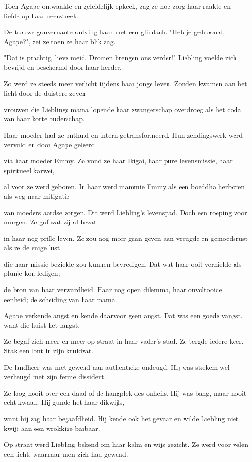 Toen Agape ontwaakte
en geleidelijk opkeek,
zag ze hoe zorg haar raakte
en liefde op haar neerstreek.

De trouwe gouvernante
ontving haar met een glimlach.
"Heb je gedroomd, Agape?",
zei ze toen ze haar blik zag.

"Dat is prachtig, lieve meid.
Dromen brengen ons verder!"
Liebling voelde zich bevrijd
en beschermd door haar herder.

Zo werd ze steeds meer verlicht
tijdens haar jonge leven.
Zonden kwamen aan het licht
door de duistere zeven

vrouwen die Lieblings mama
lopende haar zwangerschap
overdroeg als het coda
van haar korte ouderschap.

Haar moeder had ze onthuld
en intern getransformeerd.
Hun zendingswerk werd vervuld
en door Agape geleerd

via haar moeder Emmy.
Zo vond ze haar Ikigai,
haar pure levensmissie,
haar spiritueel karwei,

al voor ze werd geboren.
In haar werd mammie Emmy
als een boeddha herboren
als weg naar mitigatie

van moeders aardse zorgen.
Dit werd Liebling’s levenspad.
Doch een roeping voor morgen.
Ze gaf wat zij al bezat

in haar nog prille leven.
Ze zou nog meer gaan geven
aan vreugde en gemoedsrust als ze de enige lust

die haar missie bezielde
zou kunnen bevredigen.
Dat wat haar ooit vernielde
als plunje kon ledigen;

de bron van haar verwardheid.
Haar nog open dilemma,
haar onvoltooide eenheid;
de scheiding van haar mama.

Agape verkende angst
en kende daarvoor geen angst.
Dat was een goede vangst,
want die huist het langst.

Ze begaf zich meer en meer
op straat in haar vader’s stad.
Ze tergde iedere keer.
Stak een lont in zijn kruidvat.

De landheer was niet gewend
aan authentieke ondeugd.
Hij was stiekem wel verheugd
met zijn ferme dissident.

Ze loog nooit over een daad
of de hangplek des onheils.
Hij was bang, maar nooit echt kwaad.
Hij gunde het haar dikwijls,

want hij zag haar begaafdheid.
Hij kende ook het gevaar
en wilde Liebling niet kwijt
aan een wrokkige barbaar.

Op straat werd Liebling bekend
om haar kalm en wijs gezicht.
Ze werd voor velen een licht,
waarnaar men zich had gewend.

